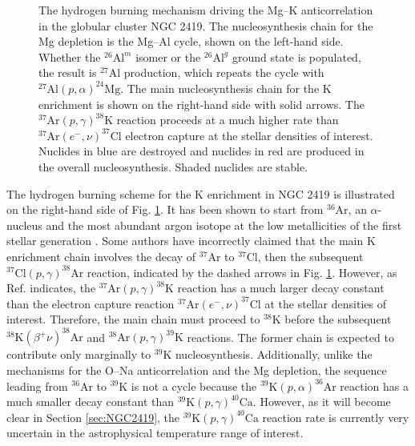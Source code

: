 \begin{figure}[t]
\begin{minipage}{.44\linewidth}
\begin{tikzpicture}[scale=1.5, every node/.style={transform shape}]
\end{tikzpicture}
\end{minipage}
\vspace{0.75 cm}
\caption{\label{fig:MgKHBurning}The hydrogen burning mechanism driving the Mg--K anticorrelation in the globular cluster NGC 2419. The nucleosynthesis chain for the Mg depletion is the Mg--Al cycle, shown on the left-hand side. Whether the $^{26}\mathrm{Al}^{m}$ isomer or the $^{26}\mathrm{Al}^{g}$ ground state is populated, the result is $^{27}$Al production, which repeats the cycle with $^{27}\mathrm{Al}(p,\alpha)^{24}\mathrm{Mg}$. The main nucleosynthesis chain for the K enrichment is shown on the right-hand side with solid arrows. The $^{37}\mathrm{Ar}(p, \gamma)^{38}\mathrm{K}$ reaction proceeds at a much higher rate than $^{37}\mathrm{Ar}(e^{-},\nu)^{37}\mathrm{Cl}$ electron capture at the stellar densities of interest. Nuclides in blue are destroyed and nuclides in red are produced in the overall nucleosynthesis. Shaded nuclides are stable.}
\end{figure}

The hydrogen burning scheme for the K enrichment in NGC 2419 is illustrated on the right-hand side of Fig. \ref{fig:MgKHBurning}. It has been shown to start from $^{36}$Ar, an $\alpha$-nucleus and the most abundant argon isotope at the low metallicities of the first stellar generation \cite{Ventura2012}. Some authors \cite{Ventura2012,Mucciarelli2015} have incorrectly claimed that the main K enrichment chain involves the decay of $^{37}$Ar to $^{37}$Cl, then the subsequent $^{37}\mathrm{Cl}(p,\gamma)^{38}\mathrm{Ar}$ reaction, indicated by the dashed arrows in Fig. \ref{fig:MgKHBurning}. However, as Ref. \cite{Iliadis2016} indicates, the $^{37}\mathrm{Ar}(p,\gamma)^{38}\mathrm{K}$ reaction has a much larger decay constant than the electron capture reaction $^{37}\mathrm{Ar}(e^{-}, \nu)^{37}\mathrm{Cl}$ at the stellar densities of interest. Therefore, the main chain must proceed to $^{38}$K before the subsequent $^{38}\mathrm{K}(\beta^{+}\nu)^{38}\mathrm{Ar}$ and $^{38}\mathrm{Ar}(p,\gamma)^{39}\mathrm{K}$ reactions. The former chain is expected to contribute only marginally to $^{39}$K nucleosynthesis. Additionally, unlike the mechanisms for the O--Na anticorrelation and the Mg depletion, the sequence leading from $^{36}$Ar to $^{39}$K is not a cycle because the $^{39}\mathrm{K}(p,\alpha)^{36}\mathrm{Ar}$ reaction has a much smaller decay constant than $^{39}\mathrm{K}(p,\gamma)^{40}\mathrm{Ca}$. However, as it will become clear in Section \ref{sec:NGC2419}, the $^{39}\mathrm{K}(p,\gamma)^{40}\mathrm{Ca}$ reaction rate is currently very uncertain in the astrophysical temperature range of interest.

